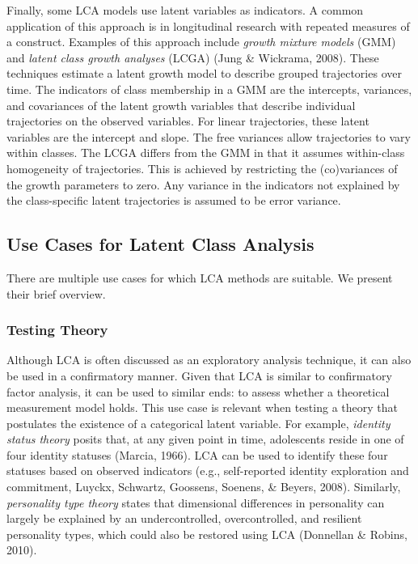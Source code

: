 \documentclass[
  ,man,floatsintext]{apa6}
\begin{document}
Finally, some LCA models use latent variables as indicators.
A common application of this approach is in
longitudinal research with repeated measures of a construct.
Examples of this approach include
\emph{growth mixture models} (GMM) and \emph{latent class growth analyses} (LCGA)
(Jung \& Wickrama, 2008).
These techniques estimate a latent growth model
to describe grouped trajectories over time.
The indicators of class membership in a GMM are the
intercepts, variances, and covariances of the latent growth variables that describe individual trajectories on the observed variables.
For linear trajectories, these latent variables are the intercept and slope.
The free variances allow trajectories to vary within classes. The LCGA differs from the GMM in that it assumes within-class homogeneity of trajectories.
This is achieved by restricting the (co)variances of the growth parameters to zero.
Any variance in the indicators not explained by the class-specific
latent trajectories is assumed to be error variance.

\hypertarget{use-cases-for-latent-class-analysis}{%
\subsection{Use Cases for Latent Class Analysis}\label{use-cases-for-latent-class-analysis}}

There are multiple use cases for which LCA methods are suitable. We present their brief overview.

\hypertarget{testing-theory}{%
\subsubsection{Testing Theory}\label{testing-theory}}

Although LCA is often discussed as an exploratory analysis technique,
it can also be used in a confirmatory manner.
Given that LCA is similar to confirmatory factor analysis,
it can be used to similar ends:
to assess whether a theoretical measurement model holds.
This use case is relevant when testing a theory that postulates the existence of a categorical latent variable.
For example, \emph{identity status theory} posits that, at any given point in time, adolescents reside in one of four identity statuses (Marcia, 1966).
LCA can be used to identify these four statuses based on observed indicators (e.g., self-reported identity exploration and commitment, Luyckx, Schwartz, Goossens, Soenens, \& Beyers, 2008).
Similarly, \emph{personality type theory} states that dimensional differences in personality can largely be explained by an undercontrolled, overcontrolled, and resilient personality types, which could also be restored using LCA (Donnellan \& Robins, 2010).
\end{document}
